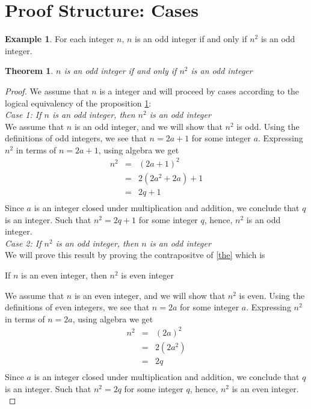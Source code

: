 \documentclass{book}
\newtheorem{theorem}{Theorem}[section]
\theoremstyle{definition}
\newtheorem{example}{Example}[definition]
\theoremstyle{remark}
\begin{document}
\newpage
\section{Proof Structure: Cases}

\begin{example}
For each integer $n$, $n$ is an odd integer if and only if $n^2$ is an odd integer. \\

\begin{tcolorbox}
	\begin{theorem}
	\label{the2}		
		$n$ is an odd integer if and only if $n^2$ is an odd integer
	\end{theorem}
\end{tcolorbox}

\begin{proof}
    We assume that $n$ is a integer and will proceed by cases according to the logical equivalency of the proposition \ref{the2}: \\
    
    {\it Case 1: If $n$ is an odd integer, then $n^2$ is an odd integer } \\
    We assume that $n$ is an odd integer, and we will show that $n^2$ is odd. Using the definitions of odd integers, we see that $n = 2a + 1$ for some integer $a$. Expressing $n^2$ in terms of $n = 2a + 1$, using algebra we get
        \begin{eqnarray*}
        n^2 & = & (2a + 1)^2  \nonumber \\
        & = & 2(2a^2 + 2a) + 1 \nonumber \\
        & = & 2q + 1 \nonumber \\
        \end{eqnarray*}
    Since $a$ is an integer closed under multiplication and addition, we conclude that $q$ is an integer. Such that $n^2 = 2q + 1$ for some integer $q$, hence, $n^2$ is an odd integer. \\
    
    {\it Case 2: If $n^2$ is an odd integer, then $n$ is an odd integer} \\
    We will prove this result by proving the contrapositve of \ref{the} which is
    	\begin{center}
    		If $n$ is an even integer, then $n^2$ is even integer
    	\end{center}
    
    We assume that $n$ is an even integer, and we will show that $n^2$ is even. Using the definitions of even integers, we see that $n = 2a$ for some integer $a$. Expressing $n^2$ in terms of $n = 2a$, using algebra we get
        \begin{eqnarray*}
        n^2 & = & (2a)^2  \nonumber \\
        & = & 2(2a^2) \nonumber \\
        & = & 2q \nonumber \\
        \end{eqnarray*}
    Since $a$ is an integer closed under multiplication and addition, we conclude that $q$ is an integer. Such that $n^2 = 2q$ for some integer $q$, hence, $n^2$ is an even integer. \\
    

\end{proof}
\end{example}
\end{document}
